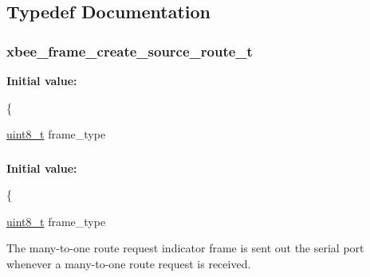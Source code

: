 \subsection{Typedef Documentation}
\hypertarget{group__xbee__route_gaa778ab3d89227051a2e7da507d4802bd}{
\subsubsection[{xbee\-\_\-frame\-\_\-create\-\_\-source\-\_\-route\-\_\-t}]{\setlength{\rightskip}{0pt plus 5cm}xbee\-\_\-frame\-\_\-create\-\_\-source\-\_\-route\-\_\-t}}\label{group__xbee__route_gaa778ab3d89227051a2e7da507d4802bd}
{\bfseries Initial value\-:}
\begin{DoxyCode}
\{
   
   \hyperlink{group__hal_gae1affc9ca37cfb624959c866a73f83c2}{uint8\_t}          frame\_type
\end{DoxyCode}
\hypertarget{group__xbee__route_gafc3f728061ea39f21f16bc8ac5d443bd}{
\subsubsection[{xbee\-\_\-frame\-\_\-route\-\_\-many\-\_\-to\-\_\-one\-\_\-req\-\_\-t}]{}}\label{group__xbee__route_gafc3f728061ea39f21f16bc8ac5d443bd}
{\bfseries Initial value\-:}
\begin{DoxyCode}
\{
   
   \hyperlink{group__hal_gae1affc9ca37cfb624959c866a73f83c2}{uint8\_t}          frame\_type
\end{DoxyCode}


The many-\/to-\/one route request indicator frame is sent out the serial port whenever a many-\/to-\/one route request is received. 

